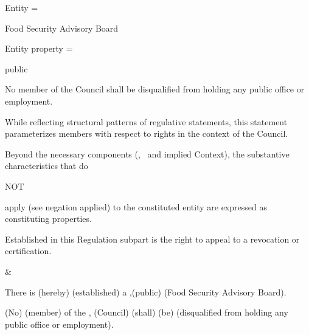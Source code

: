 \begin{landscape}
\begin{longtable}{\tabledims}
\sp

Entity = \begin{exi}Food Security Advisory Board\end{exi}

\sp

Entity property = \begin{exi}public\end{exi}

\sp



\begin{exi}No member of the Council shall be disqualified from holding any public office or employment.\end{exi}

\sp

While reflecting structural patterns of regulative statements, this statement parameterizes members with respect to rights in the context of the Council.

\sp

Beyond the necessary components (\E, \F~and implied Context), the substantive characteristics that do \begin{emp}NOT\end{emp} apply (see negation applied) to the constituted entity are expressed as constituting properties.

\sp


\begin{exi}Established in this Regulation subpart is the right to appeal to a revocation or certification.\end{exi}

&

\vspace{0.05cm}

\begin{exi} There is \Cexconst{}(hereby) \F{}(established) a \E{},\propconst{}(public) \E{}(Food Security Advisory Board). \end{exi}




\vspace{2.45cm}

\begin{exi}\NOTconst{}(No) \E{}(member) of the \E{}, \propconst{}(Council) \M{}(shall) \F{}(be) \Pp{}(disqualified from holding any public office or employment).\end{exi}

\sp



\end{longtable}
\end{landscape}
